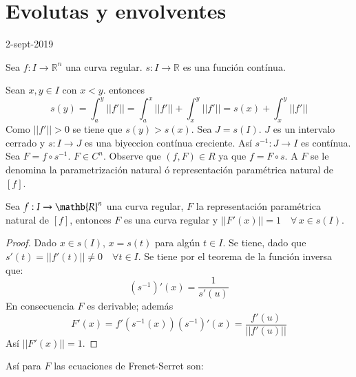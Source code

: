 \section{Evolutas y envolventes}
2-sept-2019

Sea $f: I \to \mathbb{R}^n$ una curva regular. 
$s: I \to \mathbb{R}$ es una función contínua. 

Sean $x,y \in I$ con $x<y$. entonces
\[
  s(y) = \int_a^y||f'|| = \int_a^x||f'|| + \int_x^y||f'|| = s(x) +
  \int_x^y||f'||
\]
Como $||f'||>0$ se tiene que $s(y)>s(x)$.
Sea $J = s(I)$. $J$ es un intervalo cerrado y $s:I\to J$ es una biyeccion
contínua creciente. Así $s^{-1}:J \to I$ es contínua.
Sea $F = f\circ s^{-1}$. $F \in C^n$.
Observe que $(f,F) \in R$ ya que $f = F\circ s$. A $F$ se le denomina la
parametrización natural ó representación paramétrica natural de $[f]$.
\begin{proposition}
  Sea $f: I \to \mathb{R}^n$ una curva regular, $F$ la representación
  paramétrica natural de $[f]$, entonces $F$ es una curva regular y $||F'(x)||
  =1 \quad \forall \, x \in s(I)$.
\end{proposition}
\begin{proof}
  Dado $x \in s(I)$, $x = s(t)$ para algún $t \in I$. Se tiene, dado que $s'(t)
  = ||f'(t)|| \neq 0 \quad \forall t \in I$.
  Se tiene por el teorema de la función inversa que:
  \[
    (s^{-1})'(x) = \frac{1}{s'(u)}
  \]
 En consecuencia $F$ es derivable; además
 \[
   F'(x) = f'(s^{-1} (x)) (s^{-1})'(x) = \frac{f'(u)}{||f'(u)||}
 \]
 Así $||F'(x)||=1$.
\end{proof}
Así para $F$ las ecuaciones de Frenet-Serret son:

